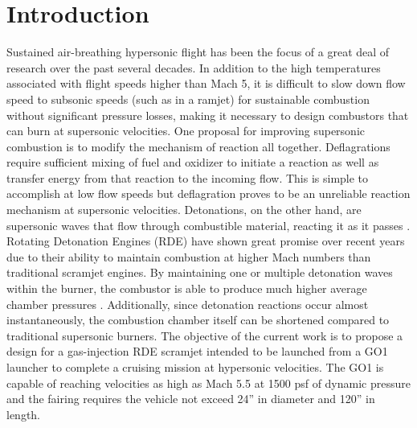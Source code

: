 \section{Introduction}
Sustained air-breathing hypersonic flight has been the focus of a great deal of research over the past several decades. In addition to the high temperatures associated with flight speeds higher than Mach 5, it is difficult to slow down flow speed to subsonic speeds (such as in a ramjet) for sustainable combustion without significant pressure losses, making it necessary to design combustors that can burn at supersonic velocities. One proposal for improving supersonic combustion is to modify the mechanism of reaction all together. Deflagrations require sufficient mixing of fuel and oxidizer to initiate a reaction as well as transfer energy from that reaction to the incoming flow. This is simple to accomplish at low flow speeds but deflagration proves to be an unreliable reaction mechanism at supersonic velocities. Detonations, on the other hand, are supersonic waves that flow through combustible material, reacting it as it passes \cite{wang}. Rotating Detonation Engines (RDE) have shown great promise over recent years due to their ability to maintain combustion at higher Mach numbers than traditional scramjet engines. By maintaining one or multiple detonation waves within the burner, the combustor is able to produce much higher average chamber pressures \cite{bykovskii}.  Additionally, since detonation reactions occur almost instantaneously, the combustion chamber itself can be shortened compared to traditional supersonic burners. The objective of the current work is to propose a design for a gas-injection RDE scramjet intended to be launched from a GO1 launcher to complete a cruising mission at hypersonic velocities. The GO1 is capable of reaching velocities as high as Mach 5.5 at 1500 psf of dynamic pressure and the fairing requires the vehicle not exceed 24” in diameter and 120” in length. 